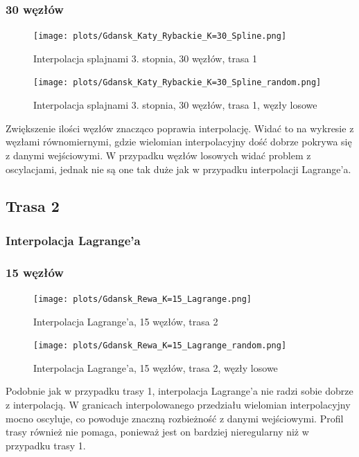 \documentclass{article}
\begin{document}
\subsubsection*{\hfil 30 węzłów \hfil }
\begin{figure}[H]
    \centering
    \texttt{[image: plots/Gdansk\_Katy\_Rybackie\_K=30\_Spline.png]}
    \caption{Interpolacja splajnami 3. stopnia, 30 węzłów, trasa 1}
\end{figure}


\begin{figure}[H]
    \centering
    \texttt{[image: plots/Gdansk\_Katy\_Rybackie\_K=30\_Spline\_random.png]}
    \caption{Interpolacja splajnami 3. stopnia, 30 węzłów, trasa 1, węzły losowe}
\end{figure}

Zwiększenie ilości węzłów znacząco poprawia interpolację. Widać to na wykresie z węzłami równomiernymi,
gdzie wielomian interpolacyjny dość dobrze pokrywa się z danymi wejściowymi. W przypadku węzłów losowych
widać problem z oscylacjami, jednak nie są one tak duże jak w przypadku interpolacji Lagrange'a.


\subsection{Trasa 2}

\subsubsection{Interpolacja Lagrange'a}

\subsubsection*{\hfil 15 węzłów \hfil }

\begin{figure}[H]
    \centering
    \texttt{[image: plots/Gdansk\_Rewa\_K=15\_Lagrange.png]}
    \caption{Interpolacja Lagrange'a, 15 węzłów, trasa 2}
\end{figure}

\begin{figure}[H]
    \centering
    \texttt{[image: plots/Gdansk\_Rewa\_K=15\_Lagrange\_random.png]}
    \caption{Interpolacja Lagrange'a, 15 węzłów, trasa 2, węzły losowe}
\end{figure}

Podobnie jak w przypadku trasy 1, interpolacja Lagrange'a nie radzi sobie dobrze z interpolacją.
W granicach interpolowanego przedziału wielomian interpolacyjny mocno oscyluje, co powoduje
znaczną rozbieżność z danymi wejściowymi. Profil trasy również nie pomaga, ponieważ jest on
bardziej nieregularny niż w przypadku trasy 1.
\end{document}
